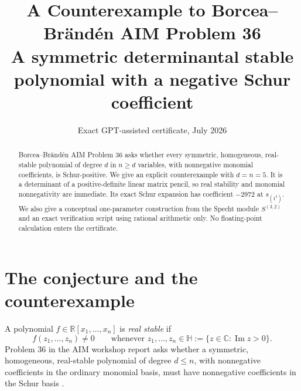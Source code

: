 \documentclass[11pt]{article}
\title{A Counterexample to Borcea--Br\"and\'en AIM Problem 36\\
\large A symmetric determinantal stable polynomial with a negative Schur coefficient}
\author{}
\date{Exact GPT-assisted certificate, July 2026}
\theoremstyle{remark}
\newcommand{\R}{\mathbb R}
\newcommand{\C}{\mathbb C}
\newcommand{\HP}{\mathbb H}
\begin{document}
\maketitle

\begin{abstract}
Borcea--Br\"and\'en AIM Problem 36 asks whether every symmetric, homogeneous,
real-stable polynomial of degree $d$ in $n\ge d$ variables, with nonnegative
monomial coefficients, is Schur-positive.  We give an explicit counterexample
with $d=n=5$.  It is a determinant of a positive-definite linear matrix pencil,
so real stability and monomial nonnegativity are immediate.  Its exact Schur
expansion has coefficient $-2972$ at $s_{(1^5)}$.  We also give a conceptual
one-parameter construction from the Specht module $S^{(3,2)}$ and an exact
verification script using rational arithmetic only.  No floating-point
calculation enters the certificate.
\end{abstract}

\section{The conjecture and the counterexample}

A polynomial $f\in\R[x_1,\dots,x_n]$ is \emph{real stable} if
\[
  f(z_1,\dots,z_n)\ne0
  \qquad\text{whenever }z_1,\dots,z_n\in\HP
  :=\{z\in\C:\operatorname{Im}z>0\}.
\]
Problem 36 in the AIM workshop report asks whether a symmetric, homogeneous,
real-stable polynomial of degree $d\le n$, with nonnegative coefficients in the
ordinary monomial basis, must have nonnegative coefficients in the Schur basis
\cite[Problem~36]{AIM2007}.
\end{document}
